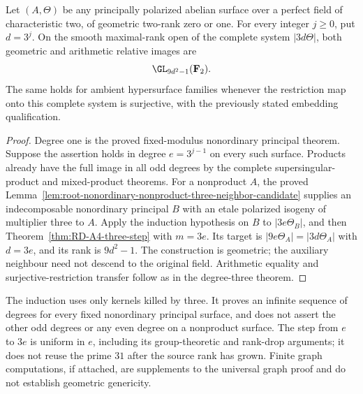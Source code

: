 \begin{corollary}
\label{cor:RD-A4-powers-three}
Let $(A,\Theta)$ be any principally polarized abelian surface over
a perfect field of characteristic two, of geometric two-rank zero
or one.  For every integer $j\ge0$, put $d=3^j$.
On the smooth maximal-rank open of the complete system
$|3d\Theta|$, both geometric and arithmetic relative images are
\[
                         \GL_{9d^2-1}(\mathbf F_2).
\]
The same holds for ambient hypersurface families whenever the
restriction map onto this complete system is surjective, with
the previously stated embedding qualification.
\end{corollary}
\begin{proof}
Degree one is the proved fixed-modulus nonordinary principal
theorem.  Suppose the assertion holds in degree $e=3^{j-1}$
on every such surface.  Products already have the full image in
all odd degrees by the complete supersingular-product and
mixed-product theorems.  For a nonproduct $A$, the proved
Lemma~\ref{lem:root-nonordinary-nonproduct-three-neighbor-candidate}
supplies an indecomposable nonordinary principal $B$ with an
etale polarized isogeny of multiplier three to $A$.
Apply the induction hypothesis on $B$ to $|3e\Theta_B|$, and
then Theorem~\ref{thm:RD-A4-three-step} with $m=3e$.
Its target is $|9e\Theta_A|=|3d\Theta_A|$ with $d=3e$,
and its rank is $9d^2-1$.  The construction is geometric;
the auxiliary neighbour need not descend to the original field.
Arithmetic equality and surjective-restriction transfer follow
as in the degree-three theorem.
\end{proof}

\begin{remark}
\label{rem:RD-A4-powers-three-scope}
The induction uses only kernels killed by three.  It proves an
infinite sequence of degrees for every fixed nonordinary principal
surface, and does not assert the other odd degrees or any even
degree on a nonproduct surface.  The step from $e$ to $3e$ is
uniform in $e$, including its group-theoretic and rank-drop
arguments; it does not reuse the prime $31$ after the source
rank has grown.  Finite graph computations, if attached, are
supplements to the universal graph proof and do not establish
geometric genericity.
\end{remark}
